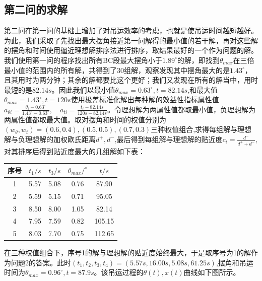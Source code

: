 \documentclass[withoutpreface,bwprint]{cumcmthesis} %
\begin{document}
\subsection{第二问的求解}
第二问在第一问的基础上增加了对吊运效率的考虑，也就是使吊运时间越短越好。为此，我们采取了先找出最大摆角接近第一问解得的最小值的若干解，再对这些解的摆角和时间使用逼近理想解排序法进行排序，取结果最好的一个作为问题的解。我们使用第一问的程序找出所有BC段最大摆角小于$1.89^{\circ}$的解，即找到$\theta_{max}$在三倍最小值的范围内的所有解，共得到了30组解，观察发现其中摆角最大的是$1.43^{\circ}$，且其用时为两分钟；其余的解都要比这个更好；我们又发现在所有的解当中，用时最短的是$82.14s$。因此我们以最小值$\theta_{max}=0.63^{\circ},t=82.14s$,和最大值$\theta_{max}=1.43^{\circ},t=120s$使用极差标准化解出每种解的效益性指标属性值$a_{\theta i}=\frac{\theta_i-0.63^{\circ}}{1.43^{\circ}-0.63^{\circ}},\quad a_{ti}=\frac{t_i-82.14s}{120s-82.14s}$。令理想解为两属性值都取最小值，负理想解为两属性值都取最大值。取对摆角和时间的权值分别为$(w_{\theta},w_t)=(0.6,0.4),(0.5,0.5),(0.7,0.3)$三种权值组合,求得每组解与理想解与负理想解的加权欧氏距离$d^+,d^-$,最后得到每组解与理想解的贴近度$c_i=\frac{d^-}{d^++d^-}$,对其排序后得到贴近度最大的几组解如下表：
\begin{table}[!h]
    \centering
    \begin{tabular}{|c|c|c|c|c|}
    \hline
    序号 & $t_1/s$ & $t_3/s$ & $\theta_{max}/^{\circ}$ & $t/s$    \\ \hline
    1  & 5.57 & 5.08 & 0.76                    & 87.90  \\ \hline
    2  & 5.59 & 5.15 & 0.71                    & 95.05  \\ \hline
    3  & 8.50 & 8.00 & 1.05                    & 82.14  \\ \hline
    4  & 7.95 & 7.59 & 0.82                    & 105.15 \\ \hline
    5  & 8.03 & 7.70 & 0.75                    & 112.65 \\ \hline
    \end{tabular}
    \end{table}
\newpage
在三种权值组合下，序号1的解与理想解的贴近度始终最大，于是取序号为1的解作为问题2的答案。此时$(t_1,t_2,t_3,t_4)=(5.57s,16.00s,5.08s,61.25s)$,摆角和吊运时间为$\theta_{max}=0.96^{\circ},t=87.9s$。该吊运过程的$\theta(t),x(t)$曲线如下图所示。
\end{document}
